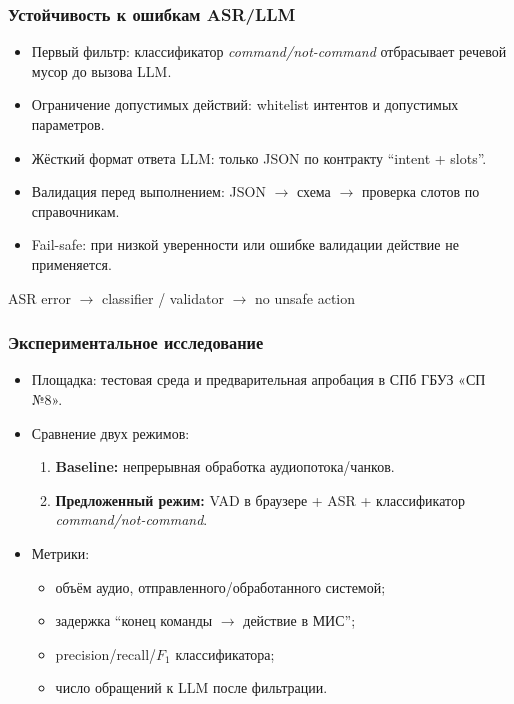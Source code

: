 \documentclass{beamer}
\begin{document}
\begin{frame}[fragile]
  \frametitle{Устойчивость к ошибкам ASR/LLM}

  \begin{itemize}
    \item Первый фильтр: классификатор \textit{command/not-command} отбрасывает речевой мусор до вызова LLM.
    \item Ограничение допустимых действий: whitelist интентов и допустимых параметров.
    \item Жёсткий формат ответа LLM: только JSON по контракту \enquote{intent + slots}.
    \item Валидация перед выполнением: JSON $\rightarrow$ схема $\rightarrow$ проверка слотов по справочникам.
    \item Fail-safe: при низкой уверенности или ошибке валидации действие не применяется.
  \end{itemize}

  \vspace{4pt}
  \begin{center}
    \small
    ASR error $\rightarrow$ classifier / validator $\rightarrow$ no unsafe action
  \end{center}
\end{frame}

\begin{frame}
  \frametitle{Экспериментальное исследование}
  \begin{itemize}
    \item Площадка: тестовая среда и предварительная апробация в СПб ГБУЗ «СП №8».
    \item Сравнение двух режимов:
    \begin{enumerate}
      \item \textbf{Baseline:} непрерывная обработка аудиопотока/чанков.
      \item \textbf{Предложенный режим:} VAD в браузере + ASR + классификатор \textit{command/not-command}.
    \end{enumerate}
    \item Метрики:
    \begin{itemize}
      \item объём аудио, отправленного/обработанного системой;
      \item задержка \enquote{конец команды $\rightarrow$ действие в МИС};
      \item precision/recall/$F_1$ классификатора;
      \item число обращений к LLM после фильтрации.
    \end{itemize}
  \end{itemize}
\end{frame}
\end{document}
